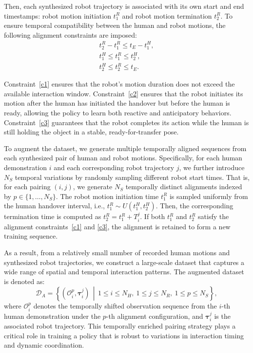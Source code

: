\documentclass[final,5p,times,twocolumn]{elsarticle}
\begin{document}
Then, each synthesized robot trajectory is associated with its own start and end timestamps: robot motion initiation $t_{1}^R$ and robot motion termination $t_2^R$. To ensure temporal compatibility between the human and robot motions, the following alignment constraints are imposed:
\begin{gather}
    t_2^R -t_1^R \leq t_E - t_1^H,  \label{c1} \\
    t_1^H \leq t_1^R \leq t_2^H,  \label{c2} \\
    t_2^H \leq t_2^R \leq t_E. \label{c3}
\end{gather}

Constraint~\ref{c1} ensures that the robot’s motion duration does not exceed the available interaction window. Constraint~\ref{c2} ensures that the robot initiates its motion after the human has initiated the handover but before the human is ready, allowing the policy to learn both reactive and anticipatory behaviors. Constraint~\ref{c3} guarantees that the robot completes its action while the human is still holding the object in a stable, ready-for-transfer pose.

To augment the dataset, we generate multiple temporally aligned sequences from each synthesized pair of human and robot motions. Specifically, for each human demonstration $i$ and each corresponding robot trajectory $j$, we further introduce $N_S$ temporal variations by randomly sampling different robot start times. That is, for each pairing $(i, j)$, we generate $N_S$ temporally distinct alignments indexed by $p \in \{1, \dots, N_S\}$. The robot motion initiation time $t_1^{R}$ is sampled uniformly from the human handover interval, i.e., $t_1^R \sim U(t_1^H, t_2^H)$. Then, the corresponding termination time is computed as $t_2^R = t_1^R + T_{i}^{j}$. If both $t_1^R$ and $t_2^R$ satisfy the alignment constraints~\ref{c1} and \ref{c3}, the alignment is retained to form a new training sequence.

As a result, from a relatively small number of recorded human motions and synthesized robot trajectories, we construct a large-scale dataset that captures a wide range of spatial and temporal interaction patterns. The augmented dataset is denoted as:
\begin{equation}
\mathcal{D}_A = \left\{ \left( \mathcal{O}_{i}^{p}, \boldsymbol{\tau}_{i}^{j} \right) \,\middle|\, 1 \leq i \leq N_H,\ 1 \leq j \leq N_R,\ 1 \leq p \leq N_S \right\},
\end{equation}
where $\mathcal{O}_{i}^{p}$ denotes the temporally shifted observation sequence from the $i$-th human demonstration under the $p$-th alignment configuration, and $\boldsymbol{\tau}_{i}^{j}$ is the associated robot trajectory. This temporally enriched pairing strategy plays a critical role in training a policy that is robust to variations in interaction timing and dynamic coordination.
\end{document}
